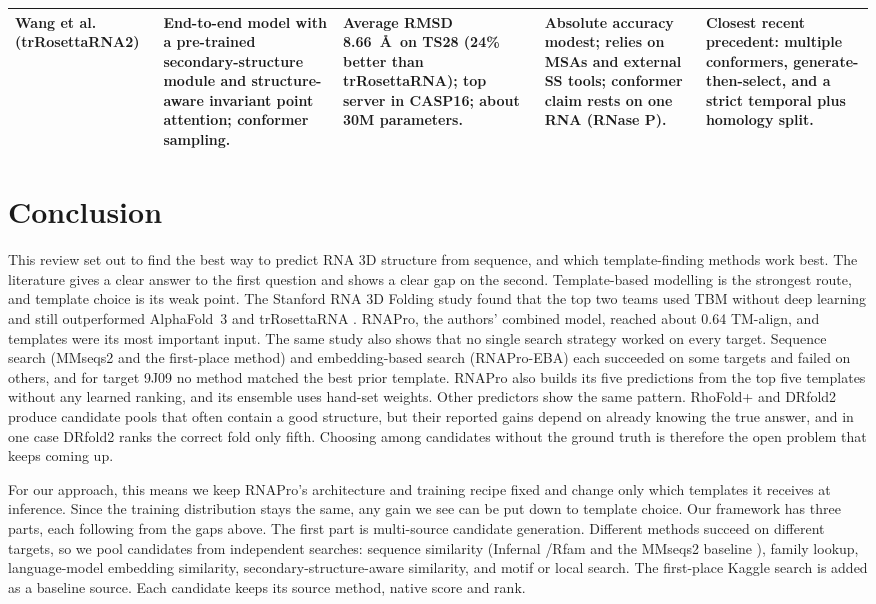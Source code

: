 \documentclass{FastFyp}
\begin{document}
{\begin{longtable}{|p{}|p{}|p{}|p{}|p{}|}
Wang et al.~\cite{wang2026trrosettarna2} (trRosettaRNA2) &
End-to-end model with a pre-trained secondary-structure module and structure-aware invariant point attention; conformer sampling. &
Average RMSD 8.66~\AA\ on TS28 (24\% better than trRosettaRNA); top server in CASP16; about 30M parameters. &
Absolute accuracy modest; relies on MSAs and external SS tools; conformer claim rests on one RNA (RNase P). &
Closest recent precedent: multiple conformers, generate-then-select, and a strict temporal plus homology split.\\ \hline
\end{longtable}
}

\section{Conclusion}

This review set out to find the best way to predict RNA 3D structure from sequence, and which template-finding methods work best. The literature gives a clear answer to the first question and shows a clear gap on the second. Template-based modelling is the strongest route, and template choice is its weak point. The Stanford RNA 3D Folding study \cite{leerna} found that the top two teams used TBM without deep learning and still outperformed AlphaFold~3 and trRosettaRNA \cite{wang2023trrosettarna}. RNAPro, the authors' combined model, reached about 0.64 TM-align, and templates were its most important input. The same study also shows that no single search strategy worked on every target. Sequence search (MMseqs2 \cite{steinegger2017} and the first-place method) and embedding-based search (RNAPro-EBA) each succeeded on some targets and failed on others, and for target 9J09 no method matched the best prior template. RNAPro also builds its five predictions from the top five templates without any learned ranking, and its ensemble uses hand-set weights. Other predictors show the same pattern. RhoFold+ \cite{ref:Shen:2024} and DRfold2 \cite{ref:Li:2026} produce candidate pools that often contain a good structure, but their reported gains depend on already knowing the true answer, and in one case DRfold2 ranks the correct fold only fifth. Choosing among candidates without the ground truth is therefore the open problem that keeps coming up.

For our approach, this means we keep RNAPro's architecture and training recipe fixed and change only which templates it receives at inference. Since the training distribution stays the same, any gain we see can be put down to template choice. Our framework has three parts, each following from the gaps above. The first part is multi-source candidate generation. Different methods succeed on different targets, so we pool candidates from independent searches: sequence similarity (Infernal \cite{nawrocki2013}/Rfam \cite{kalvari2018} and the MMseqs2 baseline \cite{steinegger2017}), family lookup, language-model embedding similarity, secondary-structure-aware similarity, and motif or local search. The first-place Kaggle search is added as a baseline source. Each candidate keeps its source method, native score and rank.
\end{document}
